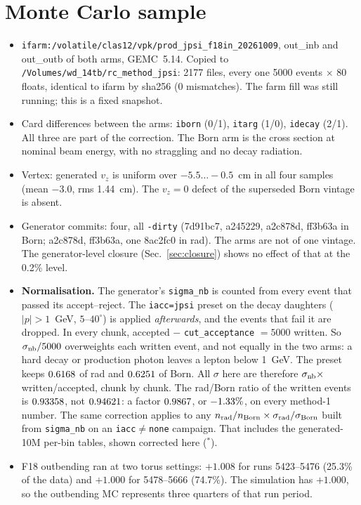 \documentclass[11pt]{article}
\begin{document}
\section{Monte Carlo sample}
\begin{itemize}
\item \texttt{ifarm:/volatile/clas12/vpk/prod\_jpsi\_f18in\_20261009}, out\_inb and out\_outb of both arms, GEMC~5.14.
Copied to \texttt{/Volumes/wd\_14tb/rc\_method\_jpsi}: 2177 files, every one 5000 events $\times$ 80 floats, identical to
ifarm by sha256 (0 mismatches). The farm fill was still running; this is a fixed snapshot.
\item Card differences between the arms: \texttt{iborn} (0/1), \texttt{itarg} (1/0), \texttt{idecay} (2/1). All three are part of
the correction. The Born arm is the cross section at nominal beam energy, with no straggling and no decay radiation.
\item Vertex: generated $v_z$ is uniform over $-5.5\ldots-0.5$~cm in all four samples (mean $-3.0$, rms 1.44~cm). The
$v_z=0$ defect of the superseded Born vintage is absent.
\item Generator commits: four, all \texttt{-dirty} (7d91bc7, a245229, a2c878d, ff3b63a in Born; a2c878d, ff3b63a, one 8ac2fc0
in rad). The arms are not of one vintage. The generator-level closure (Sec.~\ref{sec:closure}) shows no effect of that at
the 0.2\% level.
\item \textbf{Normalisation.} The generator's \texttt{sigma\_nb} is counted from every event that passed its
accept--reject. The \texttt{iacc=jpsi} preset on the decay daughters ($|p|>1$~GeV, $5$--$40^\circ$) is applied
\emph{afterwards}, and the events that fail it are dropped. In every chunk, accepted $-$ \texttt{cut\_acceptance} $=5000$
written. So $\sigma_{\rm nb}/5000$ overweights each written event, and not equally in the two arms: a hard decay or
production photon leaves a lepton below 1~GeV. The preset keeps $0.6168$ of rad and $0.6251$ of Born.
All $\sigma$ here are therefore $\sigma_{\rm nb}\times$ written/accepted, chunk by chunk. The rad/Born ratio of
the written events is $0.93358$, not $0.94621$: a factor $0.9867$, or $-1.33\%$, on every method-1 number.
The same correction applies to any $n_{\rm rad}/n_{\rm Born}\times\sigma_{\rm rad}/\sigma_{\rm Born}$ built from
\texttt{sigma\_nb} on an \texttt{iacc}$\neq$\texttt{none} campaign. That includes the generated-10M per-bin tables,
shown corrected here ($^*$).
\item F18 outbending ran at two torus settings: $+1.008$ for runs 5423--5476 (25.3\% of the data) and $+1.000$ for
5478--5666 (74.7\%). The simulation has $+1.000$, so the outbending MC represents three quarters of that run period.
\end{itemize}
\end{document}
